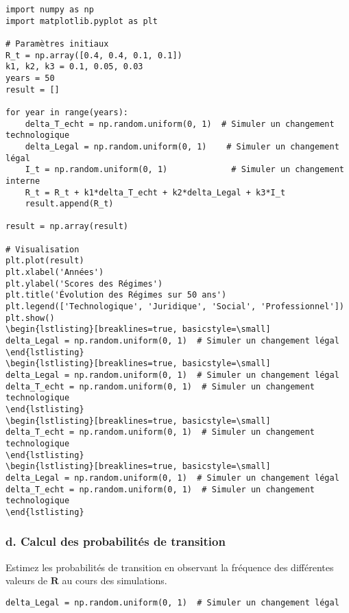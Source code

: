 \documentclass{article}
\begin{document}
\begin{verbatim}
import numpy as np
import matplotlib.pyplot as plt

# Paramètres initiaux
R_t = np.array([0.4, 0.4, 0.1, 0.1])
k1, k2, k3 = 0.1, 0.05, 0.03
years = 50
result = []

for year in range(years):
    delta_T_echt = np.random.uniform(0, 1)  # Simuler un changement technologique
    delta_Legal = np.random.uniform(0, 1)    # Simuler un changement légal
    I_t = np.random.uniform(0, 1)             # Simuler un changement interne
    R_t = R_t + k1*delta_T_echt + k2*delta_Legal + k3*I_t
    result.append(R_t)

result = np.array(result)

# Visualisation
plt.plot(result)
plt.xlabel('Années')
plt.ylabel('Scores des Régimes')
plt.title('Évolution des Régimes sur 50 ans')
plt.legend(['Technologique', 'Juridique', 'Social', 'Professionnel'])
plt.show()
\begin{lstlisting}[breaklines=true, basicstyle=\small]
delta_Legal = np.random.uniform(0, 1)  # Simuler un changement légal
\end{lstlisting}
\begin{lstlisting}[breaklines=true, basicstyle=\small]
delta_Legal = np.random.uniform(0, 1)  # Simuler un changement légal
delta_T_echt = np.random.uniform(0, 1)  # Simuler un changement technologique
\end{lstlisting}
\begin{lstlisting}[breaklines=true, basicstyle=\small]
delta_T_echt = np.random.uniform(0, 1)  # Simuler un changement technologique
\end{lstlisting}
\begin{lstlisting}[breaklines=true, basicstyle=\small]
delta_Legal = np.random.uniform(0, 1)  # Simuler un changement légal
delta_T_echt = np.random.uniform(0, 1)  # Simuler un changement technologique
\end{lstlisting}
\end{verbatim}

\subsubsection{d. Calcul des probabilités de transition}
Estimez les probabilités de transition en observant la fréquence des différentes valeurs de \( \mathbf{R} \) au cours des simulations.

\begin{lstlisting}[basicstyle=\small, breaklines=true]
delta_Legal = np.random.uniform(0, 1)  # Simuler un changement légal
\end{lstlisting}
\end{document}
